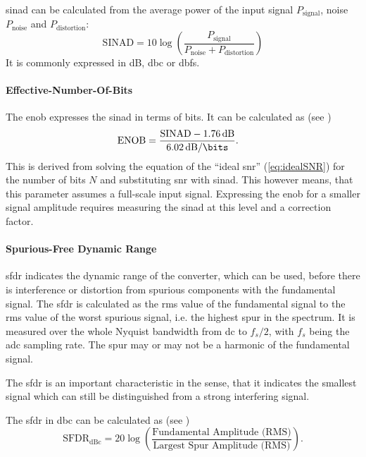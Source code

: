 \gls{sinad} can be calculated from the average power of the input signal $P_\text{signal}$, noise $P_\text{noise}$ and $P_\text{distortion}$:
\begin{equation}
	\text{SINAD} = 10 \log \left( \frac{P_\text{signal}}{P_\text{noise} + P_\text{distortion}} \right)
\end{equation}
It is commonly expressed in dB, \gls{dbc} or \gls{dbfs}.

\paragraph{Effective-Number-Of-Bits}
The \gls{enob} expresses the \gls{sinad} in terms of bits. It can be calculated as (see \cite{walt2009})
\begin{equation}
	\text{ENOB} = \frac{\text{SINAD}-\SI{1.76}{\decibel}}{\SI{6.02}{\decibel \per \bits}}. \quad 
\end{equation}
This is derived from solving the equation of the ``ideal \gls{snr}'' (\autoref{eq:idealSNR}) for the number of bits $N$ and substituting \gls{snr} with \gls{sinad}.
This however means, that this parameter assumes a full-scale input signal. Expressing the \gls{enob} for a smaller signal amplitude requires measuring the \gls{sinad} at this level and a correction factor. \cite{walt}

\paragraph{Spurious-Free Dynamic Range}
\gls{sfdr} indicates the dynamic range of the converter, which can be used, before there is interference or distortion from spurious components with the fundamental signal. \cite{Lundberg} 
The \gls{sfdr} is calculated as the \gls{rms} value of the fundamental signal to the \gls{rms} value of the worst spurious signal, i.e. the highest spur in the spectrum.
It is measured over the whole Nyquist bandwidth from \gls{dc} to $f_s/2$, with $f_s$ being the \gls{adc} sampling rate. The spur may or may not be a harmonic of the fundamental signal. \cite{walt2009, Lundberg}

The \gls{sfdr} is an important characteristic in the sense, that it indicates the smallest signal which can still be distinguished from a strong interfering signal. \cite{walt2009} 

The \gls{sfdr} in \gls{dbc} can be calculated as (see \cite{xilinx_adc})%
\begin{equation}
	\text{SFDR}_\text{dBc} = 20 \log \left( \frac{\text{Fundamental Amplitude (RMS)}}{\text{Largest Spur Amplitude (RMS)}} \right).
\end{equation}



